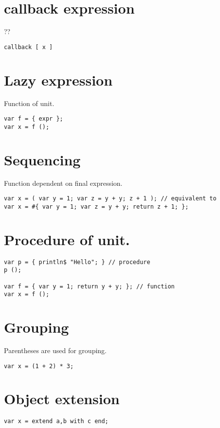 \documentclass[oneside]{book}
\begin{document}
{\section{callback expression}
??

\begin{verbatim}
callback [ x ]
\end{verbatim}


\section{Lazy expression}
Function of unit.

\begin{verbatim}
var f = { expr };
var x = f ();
\end{verbatim}


\section{Sequencing}
Function dependent on final expression.

\begin{verbatim}
var x = ( var y = 1; var z = y + y; z + 1 ); // equivalent to
var x = #{ var y = 1; var z = y + y; return z + 1; };
\end{verbatim}


\section{Procedure of unit.}

\begin{verbatim}
var p = { println$ "Hello"; } // procedure
p (); 

var f = { var y = 1; return y + y; }; // function
var x = f ();
\end{verbatim}


\section{Grouping}
Parentheses are used for grouping.

\begin{verbatim}
var x = (1 + 2) * 3;
\end{verbatim}


\section{Object extension}

\begin{verbatim}
var x = extend a,b with c end;
\end{verbatim}


}
\end{document}
